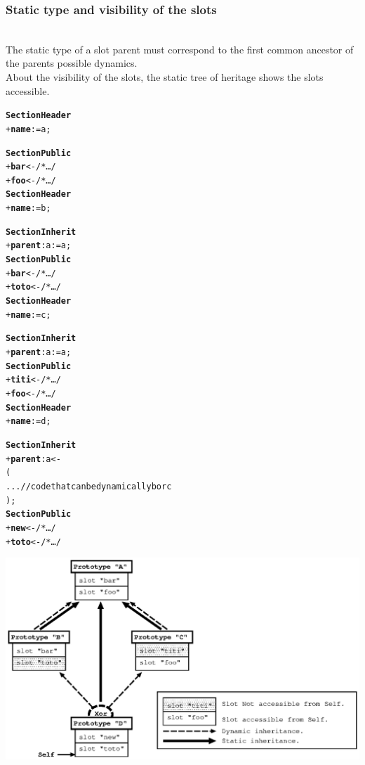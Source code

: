 \documentclass[11pt]{mybook}
\begin{document}
\subsubsection{Static type and visibility of the slots}
\label{language_reference:section_identifiers:inherit_section:visibility_slots}
%
~\\
The static type of a slot parent must correspond to the 
first common ancestor of the parents possible dynamics.
\\
About the visibility of the slots, the static tree of 
heritage shows the slots accessible.
\begin{alltt} 
{\bf{}Section Header}
  + {\bf{}name} := {\sc{}a};

{\bf{}Section Public}
  + {\bf{}bar} <- /* \ldots */
  + {\bf{}foo} <- /* \ldots */\\

{\bf{}Section Header}
  + {\bf{}name} := {\sc{}b};

{\bf{}Section Inherit}
  + {\bf{}parent}:{\sc{}a} := {\sc{}a};
{\bf{}Section Public}
  + {\bf{}bar} <- /* \ldots */
  + {\bf{}toto} <- /* \ldots */\\

{\bf{}Section Header}
  + {\bf{}name} := {\sc{}c};

{\bf{}Section Inherit}
  + {\bf{}parent}:{\sc{}a} := {\sc{}a};
{\bf{}Section Public}
  + {\bf{}titi} <- /* \ldots */
  + {\bf{}foo} <- /* \ldots */\\

{\bf{}Section Header}
  + {\bf{}name} := {\sc{}d};

{\bf{}Section Inherit}
  + {\bf{}parent}:{\sc{}a} <-
  (
  ...            // code that can be dynamically {\sc{}b} or {\sc{}c}
  );
{\bf{}Section Public}
  + {\bf{}new} <- /* \ldots */
  + {\bf{}toto} <- /* \ldots */
\end{alltt}
\begin{center}
\includegraphics[scale=1.0]{figures/type_parent}
\end{center}
\end{document}
